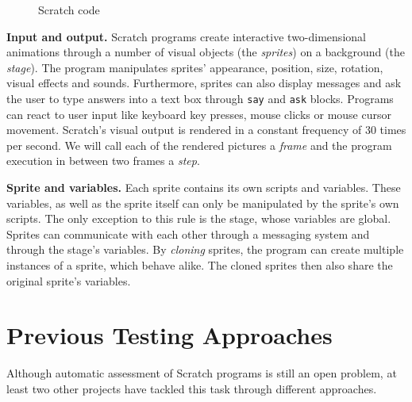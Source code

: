 \begin{figure}[htpb]
    \centering
    \caption{Scratch code}
    \label{fig:scratch_code}
\end{figure}

\textbf{Input and output.}
Scratch programs create interactive two-dimensional animations through a number of visual objects (the \textit{sprites}) on a background (the \textit{stage}).
The program manipulates sprites' appearance, position, size, rotation, visual effects and sounds.
Furthermore, sprites can also display messages and ask the user to type answers into a text box through \texttt{say} and \texttt{ask} blocks.
Programs can react to user input like keyboard key presses, mouse clicks or mouse cursor movement.
Scratch's visual output is rendered in a constant frequency of 30 times per second.
We will call each of the rendered pictures a \textit{frame} and the program execution in between two frames a \textit{step}.
\parspace

\textbf{Sprite and variables.}
Each sprite contains its own scripts and variables.
These variables, as well as the sprite itself can only be manipulated by the sprite's own scripts.
The only exception to this rule is the stage, whose variables are global.
Sprites can communicate with each other through a messaging system and through the stage's variables.
By \textit{cloning} sprites, the program can create multiple instances of a sprite, which behave alike.
The cloned sprites then also share the original sprite's variables.

\section{Previous Testing Approaches}%
\label{sec:previous_testing_approaches}

Although automatic assessment of Scratch programs is still an open problem,
at least two other projects have tackled this task through different approaches.
\parspace

